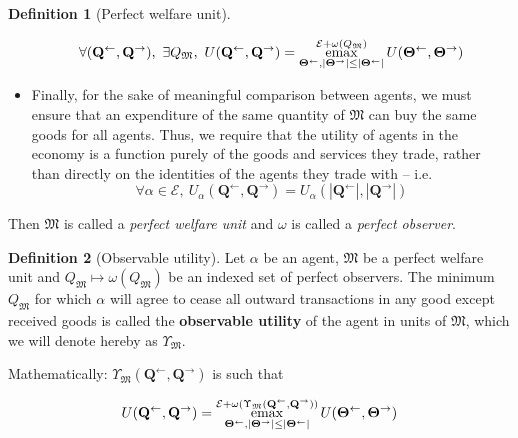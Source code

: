 \documentclass{journal}
\theoremstyle{plain}
\theoremstyle{definition}
\newtheorem{dfn}{Definition}
\theoremstyle{remark}
\newcommand{\economy}{\ensuremath{\mathcal{E}}}
\newcommand{\emax}{\ensuremath{\operatornamewithlimits{emax}}}
\newcommand{\quants}{\ensuremath{Q}} %
\newcommand{\quantl}{\ensuremath{\mathbf{Q}}} %
\newcommand{\quantg}{\ensuremath{\mathbf{\Theta}}} %
\newcommand{\agenta}{\ensuremath{\alpha}}
\newcommand{\agentz}{\ensuremath{\omega}}
\newcommand{\money}{\ensuremath{\mathfrak{M}}}
\newcommand{\utility}{\ensuremath{U}}
\newcommand{\outility}{\ensuremath{\Upsilon}}
\begin{document}
\begin{dfn}[Perfect welfare unit]
\begin{itemize}
        \begin{equation}
            \label{eq:pwu3}
            \forall (\quantl^\leftarrow, \quantl^\rightarrow), \ \exists \quants_\money,\  \utility(\quantl^\leftarrow, \quantl^\rightarrow) = \emax\limits_{\quantg^\leftarrow, |\quantg^\rightarrow|\le |\quantg^{\leftarrow}|}^{\economy + \agentz(\quants_\money)} \utility(\quantg^\leftarrow, \quantg^\rightarrow)
        \end{equation}
        \item Finally, for the sake of meaningful comparison between agents, we must ensure that an expenditure of the same quantity of $\money$ can buy the same goods for all agents. Thus, we require that the utility of agents in the economy is a function purely of the goods and services they trade, rather than directly on the identities of the agents they trade with -- i.e.
        \begin{equation}
            \label{eq:pwu4} 
            \forall \agenta\in\economy,\  \utility_\agenta(\quantl^\leftarrow, \quantl^\rightarrow) = \utility_\agenta(|\quantl^\leftarrow|, |\quantl^\rightarrow|)
        \end{equation}
    \end{itemize}
    Then $\money$ is called a \emph{perfect welfare unit} and $\agentz$ is called a \emph{perfect observer}.
\end{dfn}

\begin{dfn}[Observable utility]
    \label{dfn:ou}
    Let $\agenta$ be an agent, $\money$ be a perfect welfare unit and $\quants_\money\mapsto \agentz(\quants_\money)$ be an indexed set of perfect observers. The minimum $\quants_\money$ for which $\agenta$ will agree to cease all outward transactions in any good except received goods is called the \textbf{observable utility} of the agent in units of $\money$, which we will denote hereby as $\outility_\money$.
    
    Mathematically: $\outility_\money(\quantl^\leftarrow, \quantl^\rightarrow)$ is such that 
    
    \begin{equation}
        \label{eq:ou}
        \utility(\quantl^\leftarrow, \quantl^\rightarrow) = \emax\limits_{\quantg^\leftarrow, |\quantg^\rightarrow|\le |\quantg^{\leftarrow}|}^{\economy + \agentz(\outility_\money(\quantl^\leftarrow, \quantl^\rightarrow))} \utility(\quantg^\leftarrow, \quantg^\rightarrow)
    \end{equation}
\end{dfn}
\end{document}
